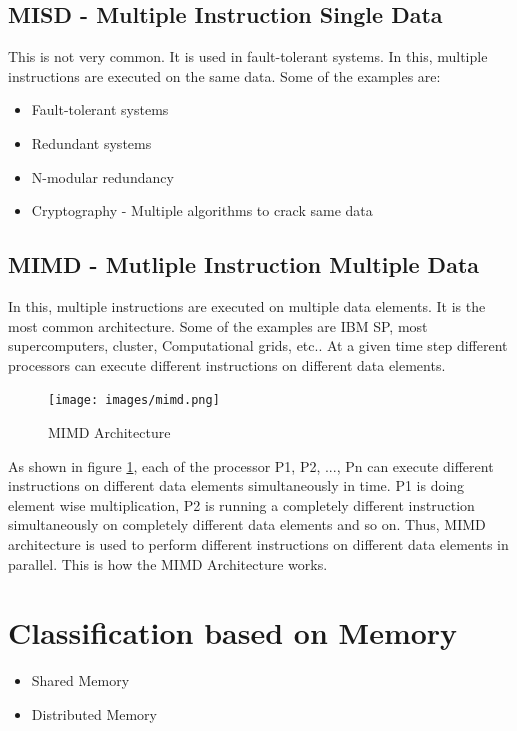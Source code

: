 \documentclass[12pt]{book}
\begin{document}
\subsection{MISD - Multiple Instruction Single Data}
This is not very common. It is used in fault-tolerant systems. In this, multiple instructions are executed on the same data.
Some of the examples are:
\begin{itemize}
    \item Fault-tolerant systems
    \item Redundant systems
    \item N-modular redundancy
    \item Cryptography - Multiple algorithms to crack same data
\end{itemize}
\subsection{MIMD - Mutliple Instruction Multiple Data}
In this, multiple instructions are executed on multiple data elements. It is the most common architecture.
Some of the examples are IBM SP, most supercomputers, cluster, Computational grids, etc..
At a given time step different processors can execute different instructions on different data elements.
\begin{figure}[H]
    \centering
    \texttt{[image: images/mimd.png]}
    \caption{MIMD Architecture}
    \label{fig:mimd}
\end{figure}
As shown in figure \ref{fig:mimd}, each of the processor P1, P2, ..., Pn can execute different instructions on different data elements simultaneously in time.
P1 is doing element wise multiplication, P2 is running a completely different instruction simultaneously on completely different data elements and so on.
Thus, MIMD architecture is used to perform different instructions on different data elements in parallel. This is how the MIMD Architecture works.

\section{Classification based on Memory}
\begin{itemize}
    \item Shared Memory
    \item Distributed Memory
\end{itemize}
\end{document}

